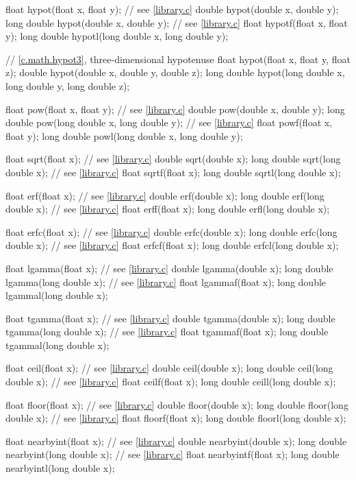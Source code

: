 \begin{codeblock}
{  float hypot(float x, float y);  // see \ref{library.c}
  double hypot(double x, double y);
  long double hypot(double x, double y);  // see \ref{library.c}
  float hypotf(float x, float y);
  long double hypotl(long double x, long double y);

  // \ref{c.math.hypot3}, three-dimensional hypotenuse
  float hypot(float x, float y, float z);
  double hypot(double x, double y, double z);
  long double hypot(long double x, long double y, long double z);

  float pow(float x, float y);  // see \ref{library.c}
  double pow(double x, double y);
  long double pow(long double x, long double y);  // see \ref{library.c}
  float powf(float x, float y);
  long double powl(long double x, long double y);

  float sqrt(float x);  // see \ref{library.c}
  double sqrt(double x);
  long double sqrt(long double x);  // see \ref{library.c}
  float sqrtf(float x);
  long double sqrtl(long double x);

  float erf(float x);  // see \ref{library.c}
  double erf(double x);
  long double erf(long double x);  // see \ref{library.c}
  float erff(float x);
  long double erfl(long double x);

  float erfc(float x);  // see \ref{library.c}
  double erfc(double x);
  long double erfc(long double x);  // see \ref{library.c}
  float erfcf(float x);
  long double erfcl(long double x);

  float lgamma(float x);  // see \ref{library.c}
  double lgamma(double x);
  long double lgamma(long double x);  // see \ref{library.c}
  float lgammaf(float x);
  long double lgammal(long double x);

  float tgamma(float x);  // see \ref{library.c}
  double tgamma(double x);
  long double tgamma(long double x);  // see \ref{library.c}
  float tgammaf(float x);
  long double tgammal(long double x);

  float ceil(float x);  // see \ref{library.c}
  double ceil(double x);
  long double ceil(long double x);  // see \ref{library.c}
  float ceilf(float x);
  long double ceill(long double x);

  float floor(float x);  // see \ref{library.c}
  double floor(double x);
  long double floor(long double x);  // see \ref{library.c}
  float floorf(float x);
  long double floorl(long double x);

  float nearbyint(float x);  // see \ref{library.c}
  double nearbyint(double x);
  long double nearbyint(long double x);  // see \ref{library.c}
  float nearbyintf(float x);
  long double nearbyintl(long double x);

}
\end{codeblock}

